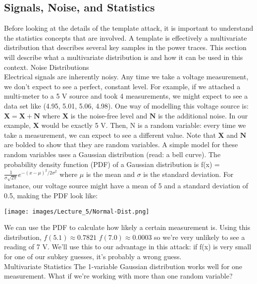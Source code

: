     \subsection{Signals, Noise, and Statistics}
    Before looking at the details of the template attack, it is important to
    understand the statistics concepts that are involved. A template is
    effectively a multivariate distribution that describes several key samples
    in the power traces. This section will describe what a multivariate
    distribution is and how it can be used in this context. Noise
    Distributions\\
    Electrical signals are inherently noisy. Any time we take a voltage
    measurement, we don't expect to see a perfect, constant level. For example,
    if we attached a multi-meter to a 5 V source and took 4 measurements, we
    might expect to see a data set like (4.95, 5.01, 5.06, 4.98). One way of
    modelling this voltage source is: $\mathbf{X} = \mathbf{X} + \mathbf{N}$
    where $\mathbf{X}$ is the noise-free level and $\mathbf{N}$ is the
    additional noise. In our example, $\mathbf{X}$ would be exactly 5 V. Then, N
    is a random variable: every time we take a measurement, we can expect to see
    a different value. Note that $\mathbf{X}$ and $\mathbf{N}$ are bolded to
    show that they are random variables. A simple model for these random
    variables uses a Gaussian distribution (read: a bell curve). The probability
    density function (PDF) of a Gaussian distribution is f(x) = $
    \frac{1}{\sigma \sqrt{2\pi}} e^{-(x - \mu)^2 / 2\sigma^2}$ where
    $\displaystyle \mu$  is the mean and  $ \sigma$ is the standard deviation.
    For instance, our voltage source might have a mean of 5 and a standard
    deviation of 0.5, making the PDF look like:\\
    \begin{minipage}{\linewidth}
    \centering
    \texttt{[image: images/Lecture\_5/Normal-Dist.png]}
    \end{minipage}
    We can use the PDF to calculate how likely a certain measurement is. Using
    this distribution, $f(5.1) \approx 0.7821$ $f(7.0) \approx 0.0003$ so we're
    very unlikely to see a reading of 7 V. We'll use this to our advantage in
    this attack: if f(x) is very small for one of our subkey guesses, it's
    probably a wrong guess.\\
    Multivariate Statistics The 1-variable Gaussian distribution works well for
    one measurement. What if we're working with more than one random variable?
